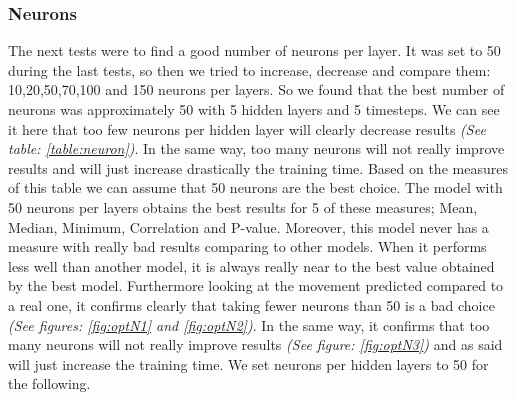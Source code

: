 \documentclass[a4]{article}
\begin{document}
\subsubsection{Neurons}
The next tests were to find a good number of neurons per layer. It was set to 50 during the last tests, so then we tried to increase, decrease and compare them: 10,20,50,70,100 and 150 neurons per layers. So we found that the best number of neurons was approximately 50 with 5 hidden layers and 5 timesteps. 
We can see it here that too few neurons per hidden layer will clearly decrease results \textit{(See table: \ref{table:neuron})}. In the same way, too many neurons will not really improve results and will just increase drastically the training time. Based on the measures of this table we can assume that 50 neurons are the best choice. The model with 50 neurons per layers obtains the best results for 5 of these measures; Mean, Median, Minimum, Correlation and P-value. Moreover, this model never has a measure with really bad results comparing to other models. When it performs less well than another model, it is always really near to the best value obtained by the best model. Furthermore looking at the movement predicted compared to a real one, it confirms clearly that taking fewer neurons than 50 is a bad choice \textit{(See figures: \ref{fig:optN1} and \ref{fig:optN2})}.
In the same way, it confirms that too many neurons will not really improve results \textit{(See figure: \ref{fig:optN3})} and as said will just increase the training time.
We set neurons per hidden layers to 50 for the following.
\end{document}
